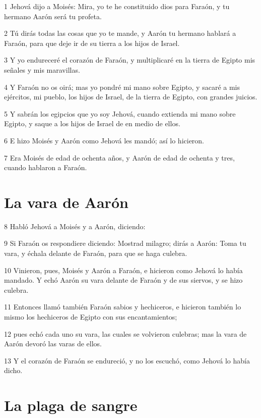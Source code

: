 \par 1 Jehová dijo a Moisés: Mira, yo te he constituido dios para Faraón, y tu hermano Aarón será tu profeta.
\par 2 Tú dirás todas las cosas que yo te mande, y Aarón tu hermano hablará a Faraón, para que deje ir de su tierra a los hijos de Israel.
\par 3 Y yo endureceré el corazón de Faraón, y multiplicaré en la tierra de Egipto mis señales y mis maravillas.
\par 4 Y Faraón no os oirá; mas yo pondré mi mano sobre Egipto, y sacaré a mis ejércitos, mi pueblo, los hijos de Israel, de la tierra de Egipto, con grandes juicios.
\par 5 Y sabrán los egipcios que yo soy Jehová, cuando extienda mi mano sobre Egipto, y saque a los hijos de Israel de en medio de ellos.
\par 6 E hizo Moisés y Aarón como Jehová les mandó; así lo hicieron.
\par 7 Era Moisés de edad de ochenta años, y Aarón de edad de ochenta y tres, cuando hablaron a Faraón.

\section*{La vara de Aarón}

\par 8 Habló Jehová a Moisés y a Aarón, diciendo:
\par 9 Si Faraón os respondiere diciendo: Mostrad milagro; dirás a Aarón: Toma tu vara, y échala delante de Faraón, para que se haga culebra.
\par 10 Vinieron, pues, Moisés y Aarón a Faraón, e hicieron como Jehová lo había mandado. Y echó Aarón su vara delante de Faraón y de sus siervos, y se hizo culebra.
\par 11 Entonces llamó también Faraón sabios y hechiceros, e hicieron también lo mismo los hechiceros de Egipto con sus encantamientos;
\par 12 pues echó cada uno su vara, las cuales se volvieron culebras; mas la vara de Aarón devoró las varas de ellos.
\par 13 Y el corazón de Faraón se endureció, y no los escuchó, como Jehová lo había dicho.

\section*{La plaga de sangre}

